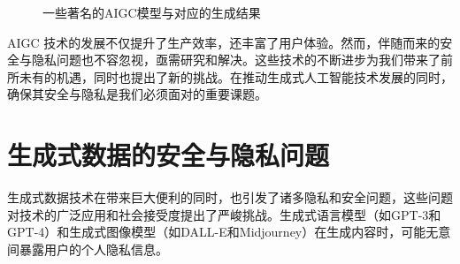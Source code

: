 \documentclass[a4paper]{nuist}
\begin{document}
\begin{figure}[htbp]
    \center
    \caption {一些著名的AIGC模型与对应的生成结果}\label{fig:eof_12}
\end{figure}

AIGC 技术的发展不仅提升了生产效率，还丰富了用户体验。然而，伴随而来的安全与隐私问题也不容忽视，亟需研究和解决。这些技术的不断进步为我们带来了前所未有的机遇，同时也提出了新的挑战。在推动生成式人工智能技术发展的同时，确保其安全与隐私是我们必须面对的重要课题。

\section{生成式数据的安全与隐私问题}

生成式数据技术在带来巨大便利的同时，也引发了诸多隐私和安全问题，这些问题对技术的广泛应用和社会接受度提出了严峻挑战。生成式语言模型（如GPT-3和GPT-4）和生成式图像模型（如DALL-E和Midjourney）在生成内容时，可能无意间暴露用户的个人隐私信息。
\end{document}
